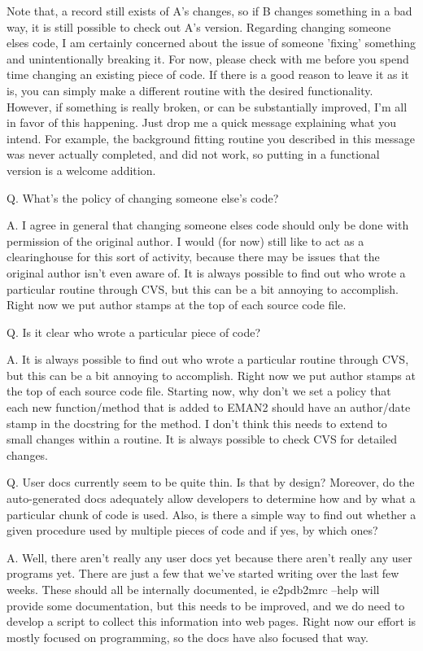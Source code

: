  Note that, a record still exists of A's changes, so if B changes something in a bad way, it is still possible to check out A's version. Regarding changing someone elses code, I am certainly concerned about the issue of someone 'fixing' something and unintentionally breaking it. For now, please check with me before you spend time changing an existing piece of code. If there is a good reason to leave it as it is, you can simply make a different routine with the desired functionality. However, if something is really broken, or can be substantially improved, I'm all in favor of this happening. Just drop me a quick message explaining what you intend. For example, the background fitting routine you described in this message was never actually completed, and did not work, so putting in a functional version is a welcome addition. 


 Q. What's the policy of changing someone else's code?


 A. I agree in general that changing someone elses code should only be done with permission of the original author. I would (for now) still like to act as a clearinghouse for this sort of activity, because there may be issues that the original author isn't even aware of. It is always possible to find out who wrote a particular routine through CVS, but this can be a bit annoying to accomplish. Right now we put author stamps at the top of each source code file. 


 Q. Is it clear who wrote a particular piece of code?


 A. It is always possible to find out who wrote a particular routine through CVS, but this can be a bit annoying to accomplish. Right now we put author stamps at the top of each source code file. Starting now, why don't we set a policy that each new function/method that is added to EMAN2 should have an author/date stamp in the docstring for the method. I don't think this needs to extend to small changes within a routine. It is always possible to check CVS for detailed changes. 


 Q. User docs currently seem to be quite thin. Is that by design? Moreover, do the auto-generated docs adequately allow developers to determine how and by what a particular chunk of code is used. Also, is there a simple way to find out whether a given procedure used by multiple pieces of code and if yes, by which ones?


 A. Well, there aren't really any user docs yet because there aren't really any user programs yet. There are just a few that we've started writing over the last few weeks. These should all be internally documented, ie e2pdb2mrc --help will provide some documentation, but this needs to be improved, and we do need to develop a script to collect this information into web pages. Right now our effort is mostly focused on programming, so the docs have also focused that way. 


